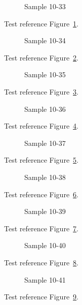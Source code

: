 \begin{figure}[tbhp]
\caption{Sample 10-33}
\label{fig:sample-10-33}
\end{figure}

Test reference Figure~\ref{fig:sample-10-33}.

\begin{figure}[tbhp]
\caption{Sample 10-34}
\label{fig:sample-10-34}
\end{figure}

Test reference Figure~\ref{fig:sample-10-34}.

\begin{figure}[tbhp]
\caption{Sample 10-35}
\label{fig:sample-10-35}
\end{figure}

Test reference Figure~\ref{fig:sample-10-35}.

\begin{figure}[tbhp]
\caption{Sample 10-36}
\label{fig:sample-10-36}
\end{figure}

Test reference Figure~\ref{fig:sample-10-36}.

\begin{figure}[tbhp]
\caption{Sample 10-37}
\label{fig:sample-10-37}
\end{figure}

Test reference Figure~\ref{fig:sample-10-37}.

\begin{figure}[tbhp]
\caption{Sample 10-38}
\label{fig:sample-10-38}
\end{figure}

Test reference Figure~\ref{fig:sample-10-38}.

\begin{figure}[tbhp]
\caption{Sample 10-39}
\label{fig:sample-10-39}
\end{figure}

Test reference Figure~\ref{fig:sample-10-39}.

\begin{figure}[tbhp]
\caption{Sample 10-40}
\label{fig:sample-10-40}
\end{figure}

Test reference Figure~\ref{fig:sample-10-40}.

\begin{figure}[tbhp]
\caption{Sample 10-41}
\label{fig:sample-10-41}
\end{figure}

Test reference Figure~\ref{fig:sample-10-41}.

